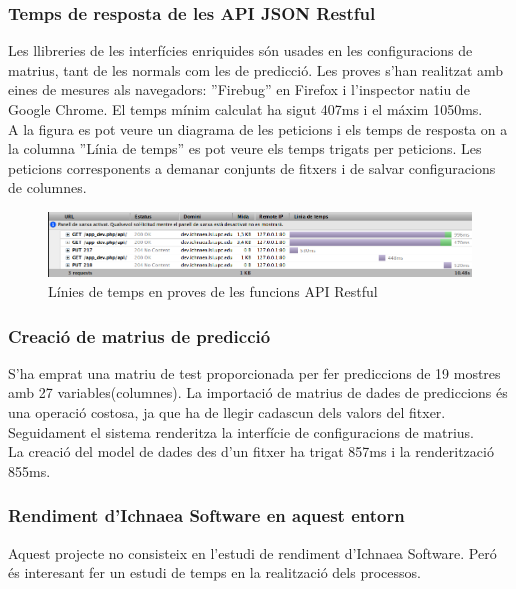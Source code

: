 \subsubsection{Temps de resposta de les API JSON Restful}
Les llibreries de les interfícies enriquides s\'{o}n usades en les configuracions de matrius, tant de les normals com les de predicci\'{o}. Les proves s'han realitzat amb eines de mesures als navegadors: ''Firebug'' en Firefox i l'inspector natiu de Google Chrome. El temps m\'{i}nim calculat ha sigut 407ms i el m\'{a}xim 1050ms.\\

A la figura  es pot veure un diagrama de les peticions i els temps de resposta on a la columna ''Línia de temps'' es pot veure els temps trigats per peticions. Les peticions corresponents a demanar conjunts de fitxers i de salvar configuracions de columnes.
\begin{figure}[h]
  \includegraphics[scale=0.4]{img/test/firebugAPI.png}
  \caption{Línies de temps en proves de les funcions API Restful}
  \label{fig:firebugAPI}
\end{figure}


\subsubsection{Creaci\'{o} de matrius de predicci\'{o}}
\label{cypruss_test}
S'ha emprat una matriu de test proporcionada per fer prediccions de 19 mostres amb 27 variables(columnes). La importaci\'{o} de matrius de dades de prediccions \'{e}s una operaci\'{o} costosa, ja que ha de llegir cadascun dels valors del fitxer. Seguidament el sistema renderitza la interfície de configuracions de matrius.\\

La creaci\'{o} del model de dades des d'un fitxer ha trigat 857ms i la renderitzaci\'{o} 855ms.

\subsubsection{Rendiment d'Ichnaea Software en aquest entorn}
Aquest projecte no consisteix en l'estudi de rendiment d'Ichnaea Software. Per\'{o} \'{e}s interesant fer un estudi de temps en la realitzaci\'{o} dels processos.

